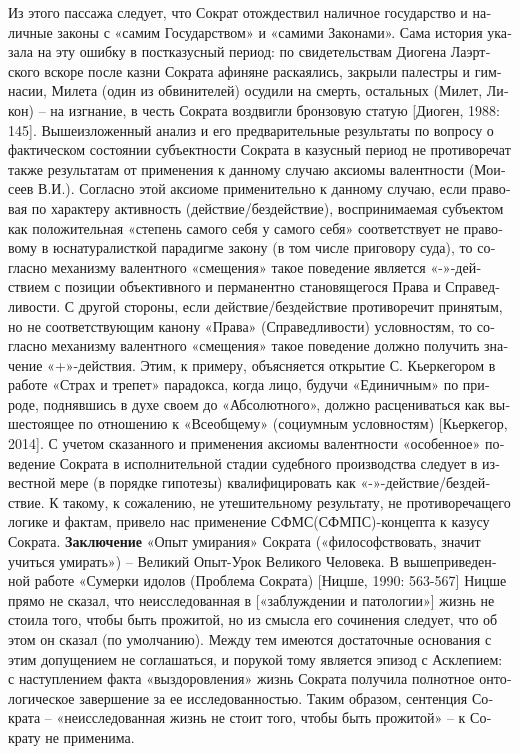 \begin{russian}
    Из этого пассажа следует, что Сократ отождествил наличное государство и наличные законы с «самим Государством» и «самими Законами». Сама история указала на эту ошибку в постказусный период: по свидетельствам Диогена Лаэртского вскоре после казни Сократа афиняне раскаялись, закрыли палестры и гимнасии, Милета (один из обвинителей) осудили на смерть, остальных (Милет, Ликон) – на изгнание, в честь Сократа воздвигли бронзовую статую [Диоген, 1988: 145].
    Вышеизложенный анализ и его предварительные результаты  по вопросу о фактическом состоянии субъектности Сократа в казусный период не противоречат также результатам от применения к данному случаю аксиомы валентности (Моисеев В.И.). Согласно этой аксиоме применительно к данному случаю, если правовая по характеру активность (действие/бездействие), воспринимаемая субъектом как положительная «степень самого себя у самого себя» соответствует не правовому в юснатуралисткой парадигме закону (в том числе приговору суда), то согласно механизму валентного «смещения» такое поведение является «-»-действием с позиции объективного и перманентно становящегося Права и Справедливости. С другой стороны, если действие/бездействие противоречит принятым, но не соответствующим канону «Права» (Справедливости) условностям, то согласно механизму валентного «смещения» такое поведение должно получить значение «+»-действия. Этим, к примеру, объясняется открытие С. Кьеркегором в работе «Страх и трепет» парадокса, когда лицо, будучи «Единичным» по природе, поднявшись в духе своем до «Абсолютного», должно расцениваться как вышестоящее по отношению к «Всеобщему» (социумным условностям) [Кьеркегор, 2014]. 
    С учетом сказанного и применения аксиомы валентности «особенное» поведение Сократа в исполнительной стадии судебного производства следует в известной мере (в порядке гипотезы) квалифицировать как «-»-действие/бездействие.
    К такому, к сожалению, не утешительному результату, не противоречащего логике и фактам, привело нас применение СФМС(СФМПС)-концепта к казусу Сократа.
    \textbf{Заключение}
     «Опыт умирания» Сократа («философствовать, значит учиться умирать») – Великий Опыт-Урок Великого Человека.
    В вышеприведенной работе «Сумерки идолов (Проблема Сократа) [Ницше, 1990: 563-567] Ницше прямо не сказал, что неисследованная в [«заблуждении и патологии»] жизнь не стоила того, чтобы быть прожитой, но из смысла его сочинения следует, что об этом он сказал (по умолчанию). Между тем имеются достаточные основания с этим допущением не соглашаться, и порукой тому является эпизод с Асклепием: с наступлением факта «выздоровления» жизнь Сократа получила полнотное онтологическое завершение за ее исследованностью. Таким образом, сентенция Сократа – «неисследованная жизнь не стоит того, чтобы быть прожитой» – к Сократу не применима.  

\end{russian}
